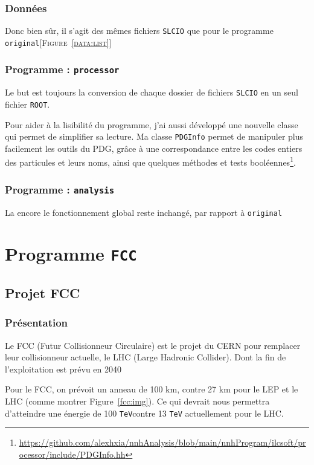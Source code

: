 \documentclass[10pt,a4paper]{report}
\newcommand{\ROOT}{\texttt{ROOT}\xspace}
\newcommand{\SLCIO}{\texttt{SLCIO}\xspace}
\newcommand{\original}{\texttt{original}\xspace}
\newcommand{\processor}{\texttt{processor}\xspace}
\newcommand{\analysis}{\texttt{analysis}\xspace}
\newcommand{\TeV}{\texttt{TeV}}
\newcommand{\Figure}[1]{[\textsc{Figure~#1}]}
\begin{document}
\subsection{Données}

Donc bien sûr, il s'agit des mêmes fichiers \SLCIO que pour le programme \original \Figure{\ref{data:list}}

\subsection{Programme : \processor}

Le but est toujours la conversion de chaque dossier de fichiers \SLCIO en un seul fichier \ROOT.

Pour aider à la lisibilité du programme, j'ai aussi développé une nouvelle classe qui permet de simplifier sa lecture.
Ma classe \texttt{PDGInfo} permet de manipuler plus facilement les outils du PDG, grâce à une correspondance entre les codes entiers des particules et leurs noms, ainsi que quelques méthodes et tests booléennes\footnote{\url{https://github.com/alexhxia/nnhAnalysis/blob/main/nnhProgram/ilcsoft/processor/include/PDGInfo.hh}}.

\subsection{Programme : \analysis}

La encore le fonctionnement global reste inchangé, par rapport à \original


\chapter{Programme \texttt{FCC}}

\section{Projet FCC}

\subsection{Présentation}

Le FCC (Futur Collisionneur Circulaire) est le projet du CERN pour remplacer 
leur collisionneur actuelle, le LHC (Large Hadronic Collider). 
Dont la fin de l'exploitation est prévu en 2040 \cite{cern:fcc}

Pour le FCC, on prévoit un anneau de 100 km, contre 27 km pour le LEP et le LHC 
(comme montrer Figure~\ref{fcc:img}).
Ce qui devrait nous permettra d'atteindre une énergie de 100 \TeV contre 13 \TeV
actuellement pour le LHC.
\end{document}
